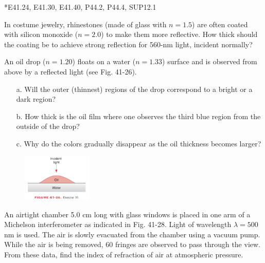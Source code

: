 \documentclass[11pt,letterpaper,boxed]{pset}
\begin{document}
    \begin{center}
        *E41.24, E41.30, E41.40, P44.2, P44.4, SUP12.1
    \end{center}
    
    \begin{problem} [*E41.24]
        In costume jewelry, rhinestones (made of glass with $n=1.5$) are often coated with silicon monoxide ($n=2.0$) to make them more reflective. How thick should the coating be to achieve strong reflection for 560-nm light, incident normally?
    \end{problem}
    \newpage
    
    \begin{problem} [E41.30]
        An oil drop ($n = 1.20$) floats on a water ($n = 1.33$) surface and is observed from above by a reflected light (see Fig. 41-26). 
        
        \begin{enumerate}
            \item [a.] Will the outer (thinnest) regions of the drop correspond to a bright or a dark region? 
            \item [b.] How thick is the oil film where one observes the third blue region from the outside of the drop? 
            \item [c.] Why do the colors gradually disappear as the oil thickness becomes larger?
        \end{enumerate}
    \end{problem}
    
    \begin{figure} [ht]
        \includegraphics[width=125px]{HW12Images/E41-30.png}
    \end{figure}
    \newpage
    
    \begin{problem} [E41.40]
        An airtight chamber 5.0 cm long with glass windows is placed in one arm of a Michelson interferometer as indicated in Fig. 41-28. Light of wavelength $\lambda=500$ nm is used. The air is slowly evacuated from the chamber using a vacuum pump. While the air is being removed, 60 fringes are observed to pass through the view. From these data, find the index of refraction of air at atmospheric pressure.
    \end{problem}
    
\end{document}
